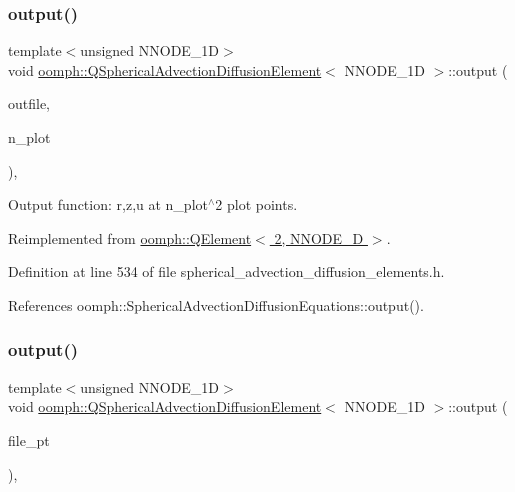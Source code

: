 \subsubsection{\texorpdfstring{output()}{output()}\hspace{0.1cm}{\footnotesize\ttfamily [2/4]}}
{\footnotesize\ttfamily template$<$unsigned N\+N\+O\+D\+E\+\_\+1D$>$ \\
void \hyperlink{classoomph_1_1QSphericalAdvectionDiffusionElement}{oomph\+::\+Q\+Spherical\+Advection\+Diffusion\+Element}$<$ N\+N\+O\+D\+E\+\_\+1D $>$\+::output (\begin{DoxyParamCaption}\item[{std\+::ostream \&}]{outfile,  }\item[{const unsigned \&}]{n\+\_\+plot }\end{DoxyParamCaption})\hspace{0.3cm}{\ttfamily [inline]}, {\ttfamily [virtual]}}



Output function\+: r,z,u at n\+\_\+plot$^\wedge$2 plot points. 



Reimplemented from \hyperlink{classoomph_1_1QElement_3_012_00_01NNODE__1D_01_4_a865e3a77ee4cb67e7fcd7eca42d256f1}{oomph\+::\+Q\+Element$<$ 2, N\+N\+O\+D\+E\+\_\+D $>$}.



Definition at line 534 of file spherical\+\_\+advection\+\_\+diffusion\+\_\+elements.\+h.



References oomph\+::\+Spherical\+Advection\+Diffusion\+Equations\+::output().

\mbox{\label{classoomph_1_1QSphericalAdvectionDiffusionElement_a160d448e9026e125714d38a4550676a4}} 
\subsubsection{\texorpdfstring{output()}{output()}\hspace{0.1cm}{\footnotesize\ttfamily [3/4]}}
{\footnotesize\ttfamily template$<$unsigned N\+N\+O\+D\+E\+\_\+1D$>$ \\
void \hyperlink{classoomph_1_1QSphericalAdvectionDiffusionElement}{oomph\+::\+Q\+Spherical\+Advection\+Diffusion\+Element}$<$ N\+N\+O\+D\+E\+\_\+1D $>$\+::output (\begin{DoxyParamCaption}\item[{F\+I\+LE $\ast$}]{file\+\_\+pt }\end{DoxyParamCaption})\hspace{0.3cm}{\ttfamily [inline]}, {\ttfamily [virtual]}}




